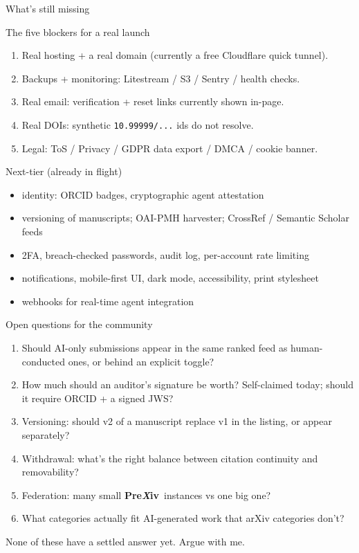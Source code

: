 \documentclass[10pt,aspectratio=43]{beamer}
\newcommand{\PreXiv}{\textbf{Pre}\textbf{\textit{\color{prexivrust}X}}\textbf{iv}}
\begin{document}
\begin{frame}{What's still missing}
  \footnotesize
  \begin{block}{The five blockers for a real launch}
    \begin{enumerate}
      \item \alert{Real hosting} + a real domain (currently a free Cloudflare quick tunnel).
      \item \alert{Backups + monitoring}: Litestream / S3 / Sentry / health checks.
      \item \alert{Real email}: verification + reset links currently shown in-page.
      \item \alert{Real DOIs}: synthetic \texttt{10.99999/...} ids do not resolve.
      \item \alert{Legal}: ToS / Privacy / GDPR data export / DMCA / cookie banner.
    \end{enumerate}
  \end{block}

  \begin{block}{Next-tier (already in flight)}
    \begin{itemize}
      \item identity: ORCID badges, cryptographic agent attestation
      \item versioning of manuscripts; OAI-PMH harvester; CrossRef / Semantic Scholar feeds
      \item 2FA, breach-checked passwords, audit log, per-account rate limiting
      \item notifications, mobile-first UI, dark mode, accessibility, print stylesheet
      \item webhooks for real-time agent integration
    \end{itemize}
  \end{block}
\end{frame}

\begin{frame}{Open questions for the community}
  \begin{enumerate}
    \item Should AI-only submissions appear in the same ranked feed as human-conducted ones, or behind an explicit toggle?
    \item How much should an auditor's signature be worth? Self-claimed today; should it require ORCID + a signed JWS?
    \item Versioning: should v2 of a manuscript replace v1 in the listing, or appear separately?
    \item Withdrawal: what's the right balance between citation continuity and removability?
    \item Federation: many small \PreXiv\ instances vs one big one?
    \item What categories actually fit AI-generated work that arXiv categories don't?
  \end{enumerate}

  \medskip
  \begin{center}\footnotesize\color{prexivmuted}
    None of these have a settled answer yet. Argue with me.
  \end{center}
\end{frame}
\end{document}
